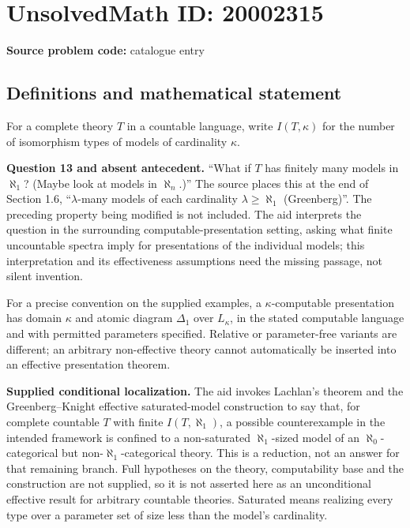 \documentclass[11pt]{article}
\begin{document}
\section*{UnsolvedMath ID: 20002315}
\textbf{Source problem code:} catalogue entry
\subsection{Definitions and mathematical statement}
For a complete theory $T$ in a countable language, write $I(T,\kappa)$ for the number of isomorphism types of models of cardinality $\kappa$.

\textbf{Question 13 and absent antecedent.} ``What if $T$ has finitely many models in $\aleph_1$? (Maybe look at models in $\aleph_n$.)'' The source places this at the end of Section 1.6, ``$\lambda$-many models of each cardinality $\lambda\ge\aleph_1$ (Greenberg)''. The preceding property being modified is not included. The aid interprets the question in the surrounding computable-presentation setting, asking what finite uncountable spectra imply for presentations of the individual models; this interpretation and its effectiveness assumptions need the missing passage, not silent invention.

For a precise convention on the supplied examples, a $\kappa$-computable presentation has domain $\kappa$ and atomic diagram $\Delta_1$ over $L_\kappa$, in the stated computable language and with permitted parameters specified. Relative or parameter-free variants are different; an arbitrary non-effective theory cannot automatically be inserted into an effective presentation theorem.

\textbf{Supplied conditional localization.} The aid invokes Lachlan's theorem and the Greenberg--Knight effective saturated-model construction to say that, for complete countable $T$ with finite $I(T,\aleph_1)$, a possible counterexample in the intended framework is confined to a non-saturated $\aleph_1$-sized model of an $\aleph_0$-categorical but non-$\aleph_1$-categorical theory. This is a reduction, not an answer for that remaining branch. Full hypotheses on the theory, computability base and the construction are not supplied, so it is not asserted here as an unconditional effective result for arbitrary countable theories. Saturated means realizing every type over a parameter set of size less than the model's cardinality.
\end{document}
